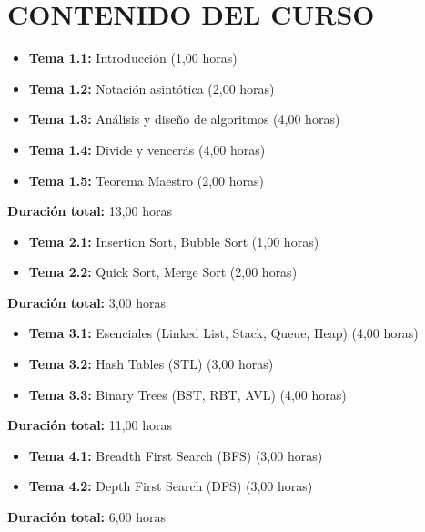\documentclass[12pt,a4paper]{article}
\begin{document}
\section{CONTENIDO DEL CURSO}

\begin{tcolorbox}[colback=white,colframe=pucpAzul,title=\textbf{UNIDAD 1: Fundamentos}]
\begin{itemize}[leftmargin=*]
    \item \textbf{Tema 1.1:} Introducción (1,00 horas)
    \item \textbf{Tema 1.2:} Notación asintótica (2,00 horas)
    \item \textbf{Tema 1.3:} Análisis y diseño de algoritmos (4,00 horas)
    \item \textbf{Tema 1.4:} Divide y vencerás (4,00 horas)
    \item \textbf{Tema 1.5:} Teorema Maestro (2,00 horas)
\end{itemize}
\textbf{Duración total:} 13,00 horas
\end{tcolorbox}

\begin{tcolorbox}[colback=white,colframe=pucpAzul,title=\textbf{UNIDAD 2: Ordenamiento}]
\begin{itemize}[leftmargin=*]
    \item \textbf{Tema 2.1:} Insertion Sort, Bubble Sort (1,00 horas)
    \item \textbf{Tema 2.2:} Quick Sort, Merge Sort (2,00 horas)
\end{itemize}
\textbf{Duración total:} 3,00 horas
\end{tcolorbox}

\begin{tcolorbox}[colback=white,colframe=pucpAzul,title=\textbf{UNIDAD 3: Estructuras de Datos}]
\begin{itemize}[leftmargin=*]
    \item \textbf{Tema 3.1:} Esenciales (Linked List, Stack, Queue, Heap) (4,00 horas)
    \item \textbf{Tema 3.2:} Hash Tables (STL) (3,00 horas)
    \item \textbf{Tema 3.3:} Binary Trees (BST, RBT, AVL) (4,00 horas)
\end{itemize}
\textbf{Duración total:} 11,00 horas
\end{tcolorbox}

\begin{tcolorbox}[colback=white,colframe=pucpAzul,title=\textbf{UNIDAD 4: Búsqueda básica}]
\begin{itemize}[leftmargin=*]
    \item \textbf{Tema 4.1:} Breadth First Search (BFS) (3,00 horas)
    \item \textbf{Tema 4.2:} Depth First Search (DFS) (3,00 horas)
\end{itemize}
\textbf{Duración total:} 6,00 horas
\end{tcolorbox}
\end{document}
